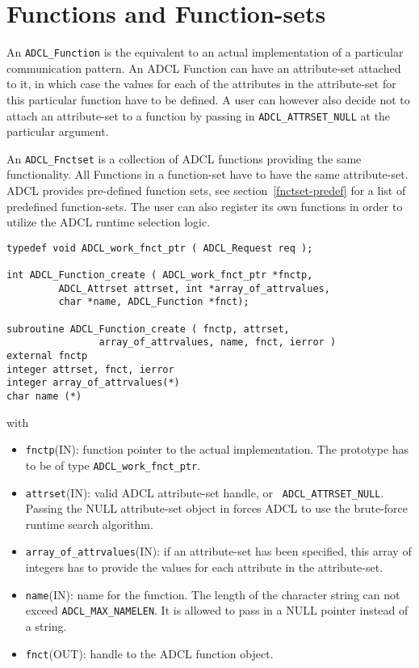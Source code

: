 \section{Functions and Function-sets}

An {\tt ADCL\_Function} is the equivalent to an actual implementation of a
particular communication pattern. An ADCL Function can have an attribute-set
attached to it, in which case the values for each of the attributes in the
attribute-set for this particular function have to be defined. A user can
however also decide not to attach an attribute-set to a function by passing in
{\tt ADCL\_ATTRSET\_NULL} at the particular argument.

An {\tt ADCL\_Fnctset} is a collection of ADCL functions providing the same
functionality. All Functions in a function-set have to have the same
attribute-set. ADCL provides pre-defined function sets, see
section~\ref{fnctset-predef} for a list of predefined function-sets. The user
can also register its own functions in order to utilize the ADCL runtime
selection logic.

\begin{verbatim}
typedef void ADCL_work_fnct_ptr ( ADCL_Request req );

int ADCL_Function_create ( ADCL_work_fnct_ptr *fnctp, 
         ADCL_Attrset attrset, int *array_of_attrvalues,  
         char *name, ADCL_Function *fnct);

subroutine ADCL_Function_create ( fnctp, attrset, 
                array_of_attrvalues, name, fnct, ierror )
external fnctp
integer attrset, fnct, ierror
integer array_of_attrvalues(*)
char name (*)	                                

\end{verbatim}
with
\begin{itemize}
\item {\tt fnctp}(IN): function pointer to the actual implementation. The
  prototype has to be of type {\tt ADCL\_work\_fnct\_ptr}.

\item {\tt attrset}(IN): valid ADCL attribute-set handle, or {\tt
  ADCL\_ATTRSET\_NULL}. Passing the NULL attribute-set object in forces ADCL
  to use the brute-force runtime search algorithm.

\item {\tt array\_of\_attrvalues}(IN): if an attribute-set has been specified,
  this array of integers has to provide the values for each attribute in the
  attribute-set.

\item {\tt name}(IN): name for the function. The length of the character
  string can not exceed {\tt ADCL\_MAX\_NAMELEN}. It is allowed to pass in a
  NULL pointer instead of a string.

\item {\tt fnct}(OUT): handle to the ADCL function object.
\end{itemize}

